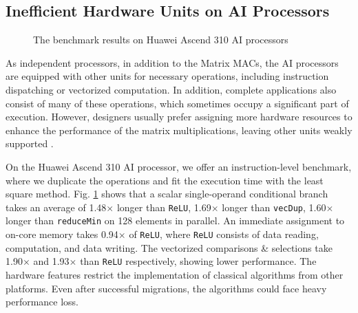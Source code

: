\documentclass[12pt]{extbook}
\begin{document}
\subsection{Inefficient Hardware Units on AI Processors \label{sec_1_2_2}}

\begin{figure}[tbp]
    \caption{The benchmark results on Huawei Ascend 310 AI processors}
    \label{fig:benchmark}
    \end{figure}

As independent processors, in addition to the Matrix MACs, the AI processors are equipped with other units for necessary operations, including instruction dispatching or vectorized computation. In addition, complete applications also consist of many of these operations, which sometimes occupy a significant part of execution. However, designers usually prefer assigning more hardware resources to enhance the performance of the matrix multiplications, leaving other units weakly supported \cite{DBLP:conf/icpp/JiW21, DBLP:conf/hotchips/LiaoTXZ19, DBLP:conf/isca/LiuDTHLXCC16, DBLP:conf/isca/JouppiYPPABBBBB17, cambricon, CANN, jax}. 

On the Huawei Ascend 310 AI processor, we offer an instruction-level benchmark, where we duplicate the operations and fit the execution time with the least square method. Fig. \ref{fig:benchmark} shows that a scalar single-operand conditional branch takes an average of 1.48$\times$ longer than \verb|ReLU|, 1.69$\times$ longer than \verb|vecDup|, 1.60$\times$ longer than \verb|reduceMin| on 128 elements in parallel. An immediate assignment to on-core memory takes 0.94$\times$ of \verb|ReLU|, where \verb|ReLU| consists of data reading, computation, and data writing. The vectorized comparisons \& selections take 1.90$\times$ and 1.93$\times$ than \verb|ReLU| respectively, showing lower performance. The hardware features restrict the implementation of classical algorithms from other platforms. Even after successful migrations, the algorithms could face heavy performance loss.
\end{document}
